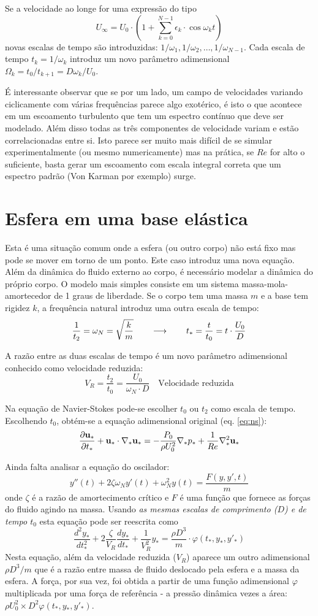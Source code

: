 Se a velocidade ao longe for uma expressão do tipo 
\[
U_\infty = U_0\cdot\left(1 + \sum_{k=0}^{N-1}\epsilon_k\cdot\cos \omega_k t\right)
\]
novas escalas de tempo são introduzidas: $1/\omega_1, 1/\omega_2, \ldots, 1/\omega_{N-1}$. Cada escala de tempo $t_k = 1/\omega_k$ introduz um novo parâmetro adimensional $\Omega_k = t_0/t_{k+1} = D\omega_k/U_0$.

É interessante observar que se por um lado, um campo de velocidades variando ciclicamente com várias frequências parece algo exotérico, é isto o que acontece em um escoamento turbulento que tem um espectro contínuo que deve ser modelado. Além disso todas as três componentes de velocidade variam e estão correlacionadas entre si. Isto parece ser muito mais difícil de se simular experimentalmente (ou mesmo numericamente) mas na prática, se $Re$ for alto o suficiente, basta gerar um escoamento com escala integral correta que um espectro padrão (Von Karman por exemplo) surge.

\section{Esfera em uma base elástica}
Esta é uma situação comum onde a esfera (ou outro corpo) não está fixo mas pode se mover em torno de um ponto. Este caso introduz uma nova equação. Além da dinâmica do fluido externo ao corpo, é necessário modelar a dinâmica do próprio corpo. O modelo mais simples consiste em um sistema massa-mola-amortecedor de 1 graus de liberdade. Se o corpo tem uma massa $m$ e a base tem rigidez $k$, a frequência natural introduz uma outra escala de tempo:
\[
\frac{1}{t_2}  = \omega_N = \sqrt{\frac{k}{m}} \qquad\longrightarrow\qquad t_* = \frac{t}{t_0} = t\cdot \frac{U_0}{D}
\]

A razão entre as duas escalas de tempo é um novo parâmetro adimensional conhecido como velocidade reduzida:
\[
V_R = \frac{t_2}{t_0} = \frac{U_0}{\omega_N\cdot D} \quad \text{Velocidade reduzida}
\]

 Na equação de Navier-Stokes pode-se escolher $t_0$ ou $t_2$ como escala de tempo. Escolhendo $t_0$, obtém-se a equação adimensional original (eq. \ref{eq:ns}):
\[
\frac{\partial \mathbf{u}_*}{\partial t_*} +  \mathbf{u}_*\cdot\nabla_* \mathbf{u_*} = -\frac{P_0}{\rho U_0^2}\nabla_* p_* + \frac{1}{Re}\nabla_*^2 \mathbf{u}_* 
\]

Ainda falta analisar a equação do oscilador:
\[
y''(t) + 2\zeta\omega_Ny'(t) + \omega_N^2y(t) = \frac{F(y, y', t)}{m}
\]
onde $\zeta$ é a razão de amortecimento crítico e $F$ é uma função que fornece as forças do fluido agindo na massa. Usando \emph{as mesmas escalas de comprimento ($D$) e de tempo $t_0$} esta equação pode ser reescrita como
\[
\frac{d^2y_*}{dt_*^2} + 2\frac{\zeta}{V_R} \frac{dy_*}{dt_*} + \frac{1}{V_R^2} y_* = \frac{\rho D^3}{m} \cdot \varphi\left(t_*, y_*, y'_*\right)
\]
Nesta equação, além da velocidade reduzida ($V_R$) aparece um outro adimensional $\rho D^3/m$ que é a razão entre massa de fluido deslocado pela esfera e a massa da esfera. A força, por sua vez, foi obtida a partir de uma função adimensional $\varphi$ multiplicada por uma força de referência - a pressão dinâmica vezes a área: $\rho U_0^2 \times D^2 \varphi(t_*, y_*, y'_*)$.

